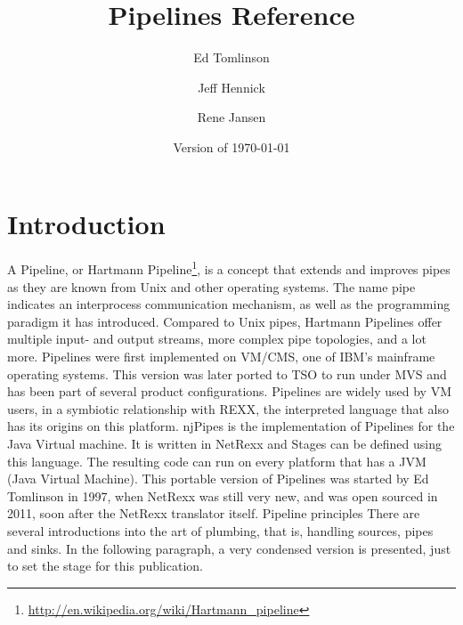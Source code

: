 

\renewcommand{\isbn}{978-90-819090-3-7}    
\setcounter{tocdepth}{1} 
\title{Pipelines Reference}
\author{Ed Tomlinson \and Jeff Hennick \and Rene Jansen}
\date{Version  of \today}
\maketitle
{}
\pagestyle{plain}
\frontmatter
{}
\pagestyle{plain}

\tableofcontents
\newpage
{}
\frontmatter
\large


\mainmatter
\chapter{Introduction}
A Pipeline, or Hartmann Pipeline\footnote{\url{http://en.wikipedia.org/wiki/Hartmann_pipeline}}, is a concept that extends and improves pipes as they are known from Unix and other operating systems. The name pipe indicates an interprocess communication mechanism, as well as the programming paradigm it has introduced. Compared to Unix pipes, Hartmann Pipelines offer multiple input- and output streams, more complex pipe topologies, and a lot more.
Pipelines were first implemented on VM/CMS, one of IBM's mainframe operating systems. This version was later ported to TSO to run under MVS and has been part of several product configurations. Pipelines are widely used by VM users, in a symbiotic relationship with REXX, the interpreted language that also has its origins on this platform.
njPipes is the implementation of Pipelines for the Java Virtual machine. It is written in NetRexx and Stages can be defined using this language. The resulting code can run on every platform that has a JVM (Java Virtual Machine). This portable version of Pipelines was started by Ed Tomlinson in 1997, when NetRexx was still very new, and was open sourced in 2011, soon after the NetRexx translator itself.
Pipeline principles
There are several introductions into the art of plumbing, that is, handling sources, pipes and sinks. In the following paragraph, a very condensed version is presented, just to set the stage for this publication.

